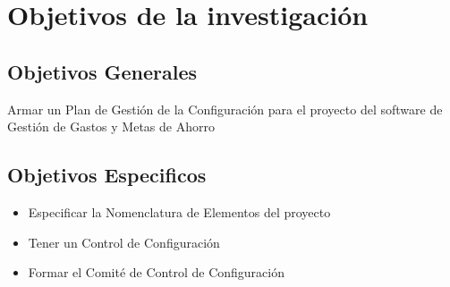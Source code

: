 
\chapter{Objetivos de la investigaci\'on}
\label{intro}


\section{Objetivos Generales}
Armar un Plan de Gestión de la Configuración para el proyecto del software de Gestión de Gastos  y Metas de Ahorro


\section{Objetivos Especificos}
\begin{itemize}
\item Especificar la Nomenclatura de Elementos del proyecto
\item Tener un Control de Configuración
\item Formar el Comité de Control de Configuración
\end{itemize}


\cleardoublepage